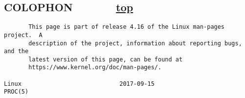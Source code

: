 \documentclass[]{article}
\begin{document}
\subsection{\texorpdfstring{\protect\hyperlink{COLOPHON}{}COLOPHON ~ ~ ~
~
\protect\hyperlink{top_of_page}{{top}}}{COLOPHON ~ ~ ~ ~ top}}\label{colophon-top}

\begin{verbatim}
       This page is part of release 4.16 of the Linux man-pages project.  A
       description of the project, information about reporting bugs, and the
       latest version of this page, can be found at
       https://www.kernel.org/doc/man-pages/.

Linux                            2017-09-15                          PROC(5)
\end{verbatim}
\end{document}
